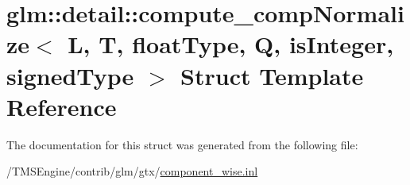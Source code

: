 \hypertarget{structglm_1_1detail_1_1compute__comp_normalize}{}\section{glm\+:\+:detail\+:\+:compute\+\_\+comp\+Normalize$<$ L, T, float\+Type, Q, is\+Integer, signed\+Type $>$ Struct Template Reference}
\label{structglm_1_1detail_1_1compute__comp_normalize}


The documentation for this struct was generated from the following file\+:\begin{DoxyCompactItemize}
\item 
/\+T\+M\+S\+Engine/contrib/glm/gtx/\hyperlink{component__wise_8inl}{component\+\_\+wise.\+inl}\end{DoxyCompactItemize}
